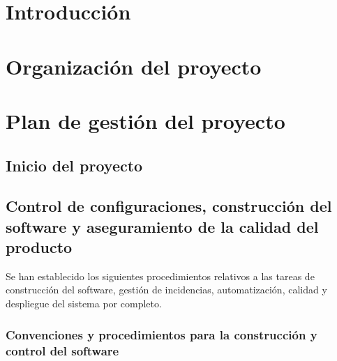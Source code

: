 \documentclass[12pt, a4paper, titlepage]{article}
\begin{document}
\thispagestyle{empty}
\fontsize{12pt}{12pt}\selectfont

\setcounter{tocdepth}{2}

\begingroup
\hypersetup{linkcolor=black}
    \tableofcontents
\endgroup

\thispagestyle{empty}

\clearpage
\setcounter{page}{1}
\section{Introducción}

\section{Organización del proyecto}

\section{Plan de gestión del proyecto}

\subsection{Inicio del proyecto}

\subsection{Control de configuraciones, construcción del software y aseguramiento de la calidad del producto}

Se han establecido los siguientes procedimientos relativos a las tareas de construcción del software, gestión de incidencias, automatización,  calidad y despliegue del sistema por completo.

\subsubsection{Convenciones y procedimientos para la construcción y control del software}
\end{document}
